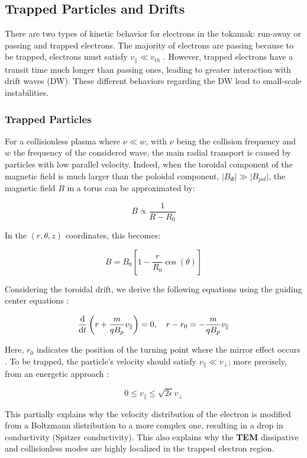 \documentclass[11pt,a4paper,openany]{report}
\begin{document}
\begin{multicols}{2}
    \subsection{Trapped Particles and Drifts}

    There are two types of kinetic behavior for electrons in the tokamak: run-away or passing and trapped electrons. The majority of electrons are passing because to be trapped, electrons must satisfy $v_\parallel \ll v_{th}$ \cite{book_banana}\cite{Banana_distr_runaway}. However, trapped electrons have a transit time much longer than passing ones, leading to greater interaction with drift waves (DW). These different behaviors regarding the DW lead to small-scale instabilities.

    \subsubsection{Trapped Particles}

    For a collisionless plasma where $\nu \ll w$, with $\nu$ being the collision frequency and $w$ the frequency of the considered wave, the main radial transport is caused by particles with low parallel velocity. Indeed, when the toroidal component of the magnetic field is much larger than the poloidal component, $\vert B_\Phi \vert \gg \vert B_{pol} \vert$, the magnetic field $B$ in a torus can be approximated by:

    $$
        B \propto \frac{1}{R - R_0}
    $$

    In the $(r, \theta, z)$ coordinates, this becomes:

    $$
        B = B_0\left[1 - \frac{r}{R_0}\cos(\theta)\right]
    $$

    Considering the toroidal drift, we derive the following equations using the guiding center equations \cite{book_banana}:

    $$
        \dv{t}\left(r + \frac{m}{qB_p}v_\parallel\right) = 0, \quad r - r_0 = -\frac{m}{qB_p}v_\parallel
    $$

    Here, $r_0$ indicates the position of the turning point where the mirror effect occurs \cite{TEM_mirror_localization}. To be trapped, the particle's velocity should satisfy $v_\parallel \ll v_\perp$; more precisely, from an energetic approach \cite{TEM_slow}:

    $$
        0 \leq v_\parallel \leq \sqrt{2\epsilon} v_\perp
    $$

    This partially explains why the velocity distribution of the electron \cite{TEM_slow,Banana_distr_runaway} is modified from a Boltzmann distribution to a more complex one, resulting in a drop in conductivity (Spitzer conductivity). This also explains why the \textbf{TEM} dissipative and collisionless modes are highly localized in the trapped electron region.


\end{multicols}
\end{document}
